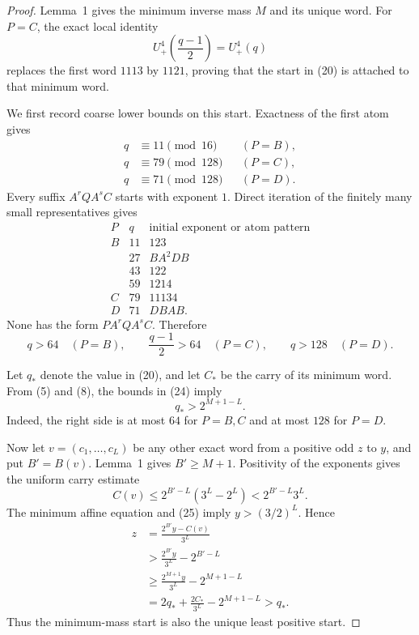 \documentclass[11pt]{article}
\newcommand{\Up}{U_+}
\begin{document}
\begin{proof}
Lemma~1 gives the minimum inverse mass $M$ and its unique word.  For
$P=C$, the exact local identity
\[
 \Up^4\!\left(\frac{q-1}{2}\right)=\Up^4(q)
 \tag{21}
\]
replaces the first word $1113$ by $1121$, proving that the start in
(20) is attached to that minimum word.

We first record coarse lower bounds on this start.  Exactness of the
first atom gives
\[
 \begin{aligned}
 q&\equiv11\pmod {16}&& (P=B),\\
 q&\equiv79\pmod {128}&& (P=C),\\
 q&\equiv71\pmod {128}&& (P=D).
 \end{aligned}
 \tag{22}
\]
Every suffix $A^rQA^sC$ starts with exponent $1$.  Direct iteration of
the finitely many small representatives gives
\[
\begin{array}{c|c|c}
P&q&\text{initial exponent or atom pattern}\\ \hline
B&11&123\\
 &27&BA^2DB\\
 &43&122\\
 &59&1214\\
C&79&11134\\
D&71&DBAB.
\end{array}
\tag{23}
\]
None has the form $PA^rQA^sC$.  Therefore
\[
 q>64\quad(P=B),
 \qquad
 \frac{q-1}{2}>64\quad(P=C),
 \qquad
 q>128\quad(P=D).
 \tag{24}
\]

Let $q_*$ denote the value in (20), and let $C_*$ be the carry of its
minimum word.  From (5) and (8), the bounds in (24) imply
\[
 \boxed{q_*>2^{M+1-L}.}
 \tag{25}
\]
Indeed, the right side is at most $64$ for $P=B,C$ and at most $128$
for $P=D$.

Now let $v=(c_1,\ldots,c_L)$ be any other exact word from a positive odd
$z$ to $y$, and put $B'=B(v)$.  Lemma~1 gives $B'\geq M+1$.  Positivity
of the exponents gives the uniform carry estimate
\[
 C(v)\leq2^{B'-L}(3^L-2^L)<2^{B'-L}3^L.
 \tag{26}
\]
The minimum affine equation and (25) imply $y>(3/2)^L$.  Hence
\[
\begin{aligned}
 z
 &=\frac{2^{B'}y-C(v)}{3^L}\\
 &>\frac{2^{B'}y}{3^L}-2^{B'-L}\\
 &\geq\frac{2^{M+1}y}{3^L}-2^{M+1-L}\\
 &=2q_*+\frac{2C_*}{3^L}-2^{M+1-L}>q_*.
\end{aligned}
\tag{27}
\]
Thus the minimum-mass start is also the unique least positive start.
\end{proof}
\end{document}
